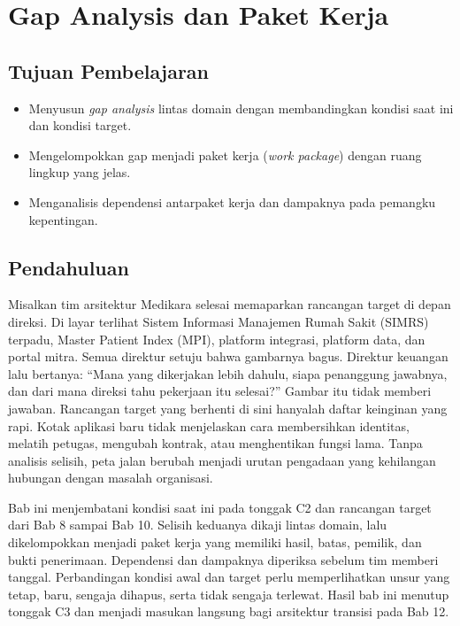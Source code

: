 \chapter{Gap Analysis dan Paket Kerja}
\label{ch:ch11}

\section*{Tujuan Pembelajaran}
\begin{itemize}
  \item Menyusun \textit{gap analysis} lintas domain dengan membandingkan kondisi saat ini dan kondisi target.
  \item Mengelompokkan gap menjadi paket kerja (\textit{work package}) dengan ruang lingkup yang jelas.
  \item Menganalisis dependensi antarpaket kerja dan dampaknya pada pemangku kepentingan.
\end{itemize}

\section{Pendahuluan}

Misalkan tim arsitektur Medikara selesai memaparkan rancangan target di depan
direksi. Di layar terlihat Sistem Informasi Manajemen Rumah Sakit (SIMRS)
terpadu, Master Patient Index (MPI), platform integrasi, platform data, dan
portal mitra. Semua direktur setuju bahwa gambarnya bagus. Direktur keuangan
lalu bertanya: ``Mana yang dikerjakan lebih dahulu, siapa penanggung jawabnya,
dan dari mana direksi tahu pekerjaan itu selesai?'' Gambar itu tidak memberi
jawaban. Rancangan target yang berhenti di sini hanyalah daftar keinginan yang
rapi. Kotak aplikasi baru tidak menjelaskan cara membersihkan identitas, melatih
petugas, mengubah kontrak, atau menghentikan fungsi lama. Tanpa analisis selisih,
peta jalan berubah menjadi urutan pengadaan yang kehilangan hubungan dengan
masalah organisasi.

Bab ini menjembatani kondisi saat ini pada tonggak C2 dan rancangan target dari
Bab 8 sampai Bab 10. Selisih keduanya dikaji lintas domain, lalu dikelompokkan
menjadi paket kerja yang memiliki hasil, batas, pemilik, dan bukti penerimaan.
Dependensi dan dampaknya diperiksa sebelum tim memberi tanggal. Perbandingan kondisi awal dan target perlu memperlihatkan unsur yang
tetap, baru, sengaja dihapus, serta tidak sengaja terlewat. Hasil bab ini menutup tonggak C3 dan menjadi masukan langsung bagi
arsitektur transisi pada Bab 12.

